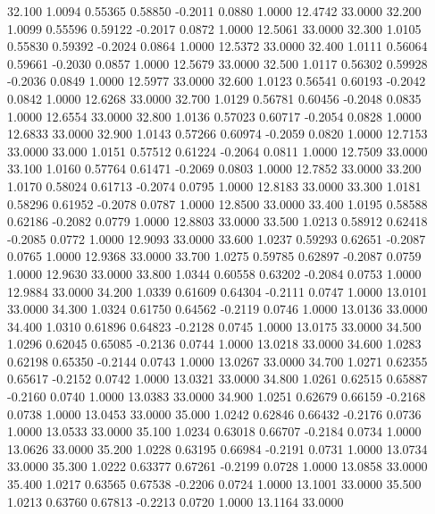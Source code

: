   32.100   1.0094   0.55365   0.58850  -0.2011   0.0880   1.0000  12.4742  33.0000
  32.200   1.0099   0.55596   0.59122  -0.2017   0.0872   1.0000  12.5061  33.0000
  32.300   1.0105   0.55830   0.59392  -0.2024   0.0864   1.0000  12.5372  33.0000
  32.400   1.0111   0.56064   0.59661  -0.2030   0.0857   1.0000  12.5679  33.0000
  32.500   1.0117   0.56302   0.59928  -0.2036   0.0849   1.0000  12.5977  33.0000
  32.600   1.0123   0.56541   0.60193  -0.2042   0.0842   1.0000  12.6268  33.0000
  32.700   1.0129   0.56781   0.60456  -0.2048   0.0835   1.0000  12.6554  33.0000
  32.800   1.0136   0.57023   0.60717  -0.2054   0.0828   1.0000  12.6833  33.0000
  32.900   1.0143   0.57266   0.60974  -0.2059   0.0820   1.0000  12.7153  33.0000
  33.000   1.0151   0.57512   0.61224  -0.2064   0.0811   1.0000  12.7509  33.0000
  33.100   1.0160   0.57764   0.61471  -0.2069   0.0803   1.0000  12.7852  33.0000
  33.200   1.0170   0.58024   0.61713  -0.2074   0.0795   1.0000  12.8183  33.0000
  33.300   1.0181   0.58296   0.61952  -0.2078   0.0787   1.0000  12.8500  33.0000
  33.400   1.0195   0.58588   0.62186  -0.2082   0.0779   1.0000  12.8803  33.0000
  33.500   1.0213   0.58912   0.62418  -0.2085   0.0772   1.0000  12.9093  33.0000
  33.600   1.0237   0.59293   0.62651  -0.2087   0.0765   1.0000  12.9368  33.0000
  33.700   1.0275   0.59785   0.62897  -0.2087   0.0759   1.0000  12.9630  33.0000
  33.800   1.0344   0.60558   0.63202  -0.2084   0.0753   1.0000  12.9884  33.0000
  34.200   1.0339   0.61609   0.64304  -0.2111   0.0747   1.0000  13.0101  33.0000
  34.300   1.0324   0.61750   0.64562  -0.2119   0.0746   1.0000  13.0136  33.0000
  34.400   1.0310   0.61896   0.64823  -0.2128   0.0745   1.0000  13.0175  33.0000
  34.500   1.0296   0.62045   0.65085  -0.2136   0.0744   1.0000  13.0218  33.0000
  34.600   1.0283   0.62198   0.65350  -0.2144   0.0743   1.0000  13.0267  33.0000
  34.700   1.0271   0.62355   0.65617  -0.2152   0.0742   1.0000  13.0321  33.0000
  34.800   1.0261   0.62515   0.65887  -0.2160   0.0740   1.0000  13.0383  33.0000
  34.900   1.0251   0.62679   0.66159  -0.2168   0.0738   1.0000  13.0453  33.0000
  35.000   1.0242   0.62846   0.66432  -0.2176   0.0736   1.0000  13.0533  33.0000
  35.100   1.0234   0.63018   0.66707  -0.2184   0.0734   1.0000  13.0626  33.0000
  35.200   1.0228   0.63195   0.66984  -0.2191   0.0731   1.0000  13.0734  33.0000
  35.300   1.0222   0.63377   0.67261  -0.2199   0.0728   1.0000  13.0858  33.0000
  35.400   1.0217   0.63565   0.67538  -0.2206   0.0724   1.0000  13.1001  33.0000
  35.500   1.0213   0.63760   0.67813  -0.2213   0.0720   1.0000  13.1164  33.0000
